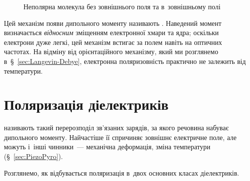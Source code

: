 \begin{figure}[h!]\centering
	\caption{Неполярна молекула без зовнішнього поля та в~зовнішньому
		полі\label{pic:InducedDipole}}
\end{figure}

Цей механізм появи дипольного моменту називають . Наведений момент визначається \emph{відносним} зміщенням електронної хмари
та ядра; оскільки електрони дуже легкі, цей механізм встигає за полем навіть на оптичних
частотах. На відміну від
орієнтаційного механізму, який ми розглянемо в~\S~\ref{sec:Langevin-Debye}, електронна
поляризовність практично не залежить від температури.


\section{Поляризація діелектриків}\label{sec:Polarization}\hypertarget{dielectric-polarization}{}


 називають такий перерозподіл зв'язаних
зарядів, за якого речовина набуває дипольного моменту. Найчастіше її спричиняє зовнішнє
електричне поле, але можуть і~інші чинники~--- механічна деформація, зміна температури
(\S~\ref{sec:PiezoPyro}).

Розглянемо, як відбувається поляризація в~двох основних класах діелектриків.

